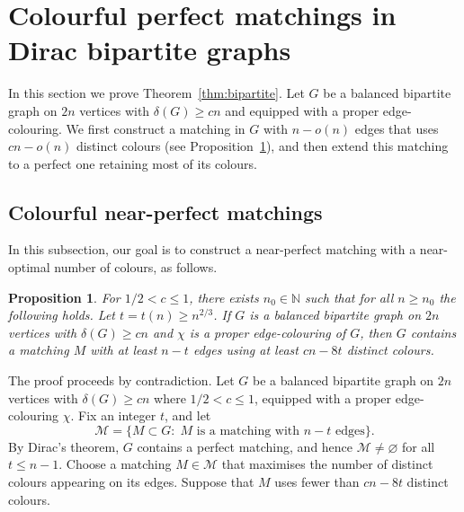 \documentclass[11pt,reqno]{amsart}
\newtheorem{proposition}[theorem]{Proposition}
\theoremstyle{definition}
\theoremstyle{remark}
\newcommand\cM{\mathcal{M}}
\renewcommand\leq{\leqslant}
\renewcommand\geq{\geqslant}
\renewcommand\le{\leqslant}
\renewcommand\ge{\geqslant}
\begin{document}
\medskip

\section{Colourful perfect matchings in Dirac bipartite graphs}\label{sec:perfectmatching}

In this section we prove Theorem~\ref{thm:bipartite}. Let $G$ be a balanced bipartite graph on $2n$ vertices with $\delta(G)\ge cn$ and equipped with a proper edge-colouring. We first construct a matching in $G$ with $n-o(n)$ edges that uses $cn-o(n)$ distinct colours (see Proposition~\ref{prop:matching}), and then extend this matching to a perfect one retaining most of its colours.



\subsection{Colourful near-perfect matchings}

In this subsection, our goal is to construct a near-perfect matching with a near-optimal number of colours, as follows.

\begin{proposition}\label{prop:matching}
For $1/2<c\le 1$, there exists $n_0\in\mathbb N$ such that for all $n\ge n_0$ the following holds. Let $t=t(n)\geq n^{2/3}$. If $G$ is a balanced bipartite graph on $2n$ vertices with $\delta(G)\ge cn$ and $\chi$ is a proper edge-colouring of $G$, then $G$ contains a matching $M$ with at least $n-t$ edges using at least $cn-8t$ distinct colours.
\end{proposition}


The proof proceeds by contradiction. Let $G$ be a balanced bipartite graph on $2n$ vertices with $\delta(G)\ge cn$ where $1/2<c\le 1$, equipped with a proper
edge-colouring $\chi$.
Fix an integer $t$, and let
\begin{equation*}%
\mathcal M=\big\{M\subset G:\; M \text{ is a matching with $n-t$ edges}\big\}.
\end{equation*}
By Dirac's theorem, $G$ contains a perfect matching, and hence $\cM\neq\varnothing$ for all $t\leq n-1$. Choose a matching $M\in\cM$ that maximises the number of distinct colours appearing on
its edges. Suppose that $M$ uses fewer than $cn-8t$ distinct colours.
\end{document}
